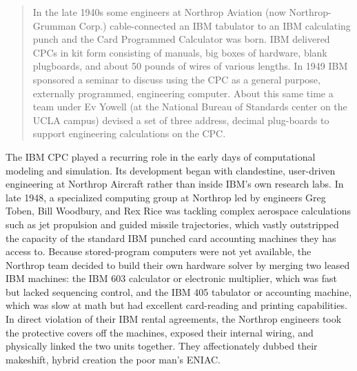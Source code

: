 \begin{quotation}
In the late 1940s some engineers at Northrop Aviation (now Northrop-Grumman Corp.) cable-connected an IBM tabulator to an IBM calculating punch and the Card Programmed Calculator was born. IBM delivered CPCs in kit form consisting of manuals, big boxes of hardware, blank plugboards, and about 50 pounds of wires of various lengths. In 1949 IBM sponsored a seminar to discuss using the CPC as a general purpose, externally programmed, engineering computer. About this same time a team under Ev Yowell (at the National Bureau of Standards center on the UCLA campus) devised a set of three address, decimal plug-boards to support engineering calculations on the CPC. \cite{patrickFirsthandOperatingSystem2011}
\end{quotation}

The IBM CPC played a recurring role in the early days of computational modeling and simulation. Its development began with clandestine, user-driven engineering at Northrop Aircraft rather than inside IBM's own research labs. In late 1948, a specialized computing group at Northrop led by engineers Greg Toben, Bill Woodbury, and Rex Rice was tackling complex aerospace calculations such as jet propulsion and guided missile trajectories, which vastly outstripped the capacity of the standard IBM punched card accounting machines they has access to. Because stored-program computers were not yet available, the Northrop team decided to build their own hardware solver by merging two leased IBM machines: the IBM 603 calculator or electronic multiplier, which was fast but lacked sequencing control, and the IBM 405 tabulator or accounting machine, which was slow at math but had excellent card-reading and printing capabilities. In direct violation of their IBM rental agreements, the Northrop engineers took the protective covers off the machines, exposed their internal wiring, and physically linked the two units together. They affectionately dubbed their makeshift, hybrid creation the poor man's ENIAC. \cite{woodburyOralHistoryInterview1973} \cite{peacemanPersonalRetrospectionReservoir1990}

